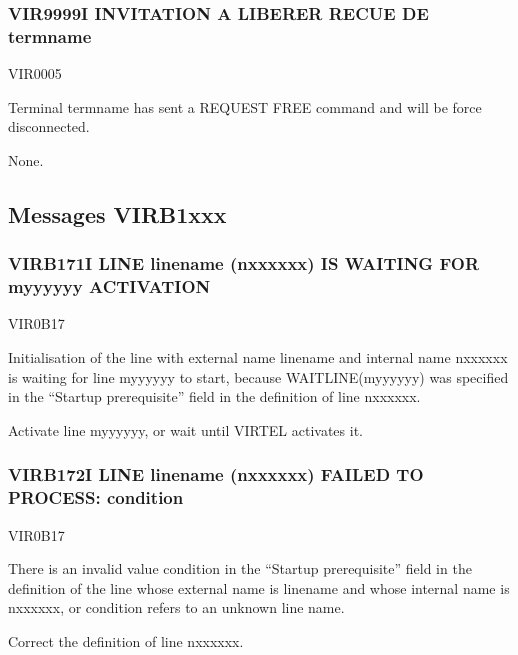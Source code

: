\documentclass[letterpaper,10pt,english]{sphinxmanual}
\begin{document}
\subsubsection{VIR9999I INVITATION A LIBERER RECUE DE termname}
\label{\detokenize{messages:vir9999i-invitation-a-liberer-recue-de-termname}}\begin{description}
\sphinxAtStartPar
VIR0005

\sphinxAtStartPar
Terminal termname has sent a REQUEST FREE command and will be force disconnected.

\sphinxAtStartPar
None.

\end{description}


\subsection{Messages VIRB1xxx}
\label{\detokenize{messages:messages-virb1xxx}}

\subsubsection{VIRB171I LINE linename (n\sphinxhyphen{}xxxxxx) IS WAITING FOR m\sphinxhyphen{}yyyyyy ACTIVATION}
\label{\detokenize{messages:virb171i-line-linename-n-xxxxxx-is-waiting-for-m-yyyyyy-activation}}\begin{description}
\sphinxAtStartPar
VIR0B17

\sphinxAtStartPar
Initialisation of the line with external name linename and internal name n\sphinxhyphen{}xxxxxx is waiting for line m\sphinxhyphen{}yyyyyy to start, because WAIT\sphinxhyphen{}LINE(m\sphinxhyphen{}yyyyyy) was specified in the “Startup prerequisite” field in the definition of line n\sphinxhyphen{}xxxxxx.

\sphinxAtStartPar
Activate line m\sphinxhyphen{}yyyyyy, or wait until VIRTEL activates it.

\end{description}


\subsubsection{VIRB172I LINE linename (n\sphinxhyphen{}xxxxxx) FAILED TO PROCESS: condition}
\label{\detokenize{messages:virb172i-line-linename-n-xxxxxx-failed-to-process-condition}}\begin{description}
\sphinxAtStartPar
VIR0B17

\sphinxAtStartPar
There is an invalid value condition in the “Startup prerequisite” field in the definition of the line whose external name is linename and whose internal name is n\sphinxhyphen{}xxxxxx, or condition refers to an unknown line name.

\sphinxAtStartPar
Correct the definition of line n\sphinxhyphen{}xxxxxx.

\end{description}
\end{document}
